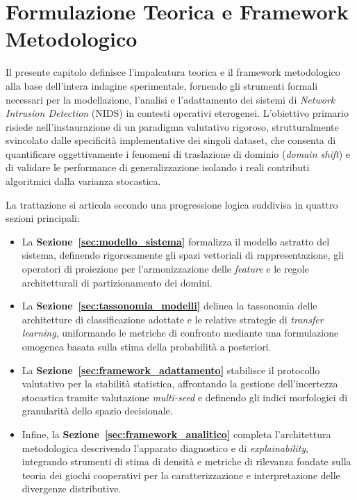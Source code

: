 \chapter{Formulazione Teorica e Framework Metodologico}
\label{ch:metodologia}

Il presente capitolo definisce l'impalcatura teorica e il framework metodologico alla base dell'intera indagine sperimentale, fornendo gli strumenti formali necessari per la modellazione, l'analisi e l'adattamento dei sistemi di \textit{Network Intrusion Detection} (NIDS) in contesti operativi eterogenei. 
L'obiettivo primario risiede nell'instaurazione di un paradigma valutativo rigoroso, strutturalmente svincolato dalle specificità implementative dei singoli dataset, che consenta di quantificare oggettivamente i fenomeni di traslazione di dominio (\textit{domain shift}) e di validare le performance di generalizzazione isolando i reali contributi algoritmici dalla varianza stocastica.

La trattazione si articola secondo una progressione logica suddivisa in quattro sezioni principali:
\begin{itemize}
    \item La \textbf{Sezione~\ref{sec:modello_sistema}} formalizza il modello astratto del sistema, definendo rigorosamente gli spazi vettoriali di rappresentazione, gli operatori di proiezione per l'armonizzazione delle \textit{feature} e le regole architetturali di partizionamento dei domini.
    \item La \textbf{Sezione~\ref{sec:tassonomia_modelli}} delinea la tassonomia delle architetture di classificazione adottate e le relative strategie di \textit{transfer learning}, uniformando le metriche di confronto mediante una formulazione omogenea basata sulla stima della probabilità a posteriori.
    \item La \textbf{Sezione~\ref{sec:framework_adattamento}} stabilisce il protocollo valutativo per la stabilità statistica, affrontando la gestione dell'incertezza stocastica tramite valutazione \textit{multi-seed} e definendo gli indici morfologici di granularità dello spazio decisionale.
    \item Infine, la \textbf{Sezione~\ref{sec:framework_analitico}} completa l'architettura metodologica descrivendo l'apparato diagnostico e di \textit{explainability}, integrando strumenti di stima di densità e metriche di rilevanza fondate sulla teoria dei giochi cooperativi per la caratterizzazione e interpretazione delle divergenze distributive.
\end{itemize}

